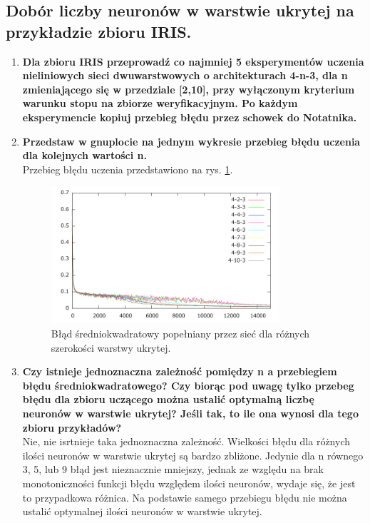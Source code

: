 \subsection{Dobór liczby neuronów w warstwie ukrytej na przykładzie zbioru IRIS.}
\begin{enumerate}
\item \textbf{ Dla zbioru IRIS przeprowadź co najmniej 5 eksperymentów uczenia nieliniowych sieci dwuwarstwowych o architekturach 4-n-3, dla n zmieniającego się w przedziale [2,10], przy wyłączonym kryterium warunku stopu na zbiorze weryfikacyjnym. Po każdym eksperymencie kopiuj przebieg błędu przez schowek do Notatnika.}

\item \textbf{
Przedstaw w gnuplocie na jednym wykresie przebieg błędu uczenia dla kolejnych wartości n.}
\\Przebieg błędu uczenia przedstawiono na rys. \ref{fig:errors4n3}.
\begin{figure}[h]
\centering
\includegraphics[width=0.8\textwidth]{dane/part1/zad4/errors4n3}
\caption{Błąd średniokwadratowy popełniany przez sieć dla różnych szerokości warstwy ukrytej.\label{fig:errors4n3}}
\end{figure}

\item \textbf{
Czy istnieje jednoznaczna zależność pomiędzy n a przebiegiem błędu średniokwadratowego? Czy biorąc pod uwagę tylko przebeg błędu dla zbioru uczącego można ustalić optymalną liczbę neuronów w warstwie ukrytej? Jeśli tak, to ile ona wynosi dla tego zbioru przykładów?}
\\Nie, nie isrtnieje taka jednoznaczna zależność. Wielkości błędu dla różnych ilości neuronów w warstwie ukrytej są bardzo zbliżone. Jedynie dla n równego 3, 5, lub 9 błąd jest nieznacznie mniejszy, jednak ze względu na brak monotoniczności funkcji błędu względem ilości neuronów, wydaje się, że jest to przypadkowa różnica. Na podstawie samego przebiegu błędu nie można ustalić optymalnej ilości neuronów w warstwie ukrytej.
\end{enumerate}

